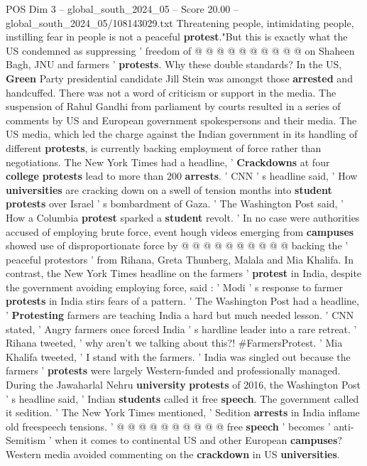 \begin{textsample}{POS Dim 3 – global\_south\_2024\_05 – Score 20.00 – global\_south\_2024\_05/108143029.txt}
Threatening people, intimidating people, instilling fear in people is not a peaceful \textbf{protest}."But this is exactly what the US condemned as suppressing ' freedom of @ @ @ @ @ @ @ @ @ @ on Shaheen Bagh, JNU and farmers ' \textbf{protests}.
Why these double standards?
In the US, \textbf{Green} Party presidential candidate Jill Stein was amongst those \textbf{arrested} and handcuffed.
There was not a word of criticism or support in the media.
The suspension of Rahul Gandhi from parliament by courts resulted in a series of comments by US and European government spokespersons and their media.
The US media, which led the charge against the Indian government in its handling of different \textbf{protests}, is currently backing employment of force rather than negotiations.
The New York Times had a headline, ' \textbf{Crackdowns} at four \textbf{college} \textbf{protests} lead to more than 200 \textbf{arrests}. ' CNN ' s headline said, ' How \textbf{universities} are cracking down on a swell of tension months into \textbf{student} \textbf{protests} over Israel ' s bombardment of Gaza. ' The Washington Post said, ' How a Columbia \textbf{protest} sparked a \textbf{student} revolt. ' In no case were authorities accused of employing brute force, event hough videos emerging from \textbf{campuses} showed use of disproportionate force by @ @ @ @ @ @ @ @ @ @ backing the ' peaceful protestors ' from Rihana, Greta Thunberg, Malala and Mia Khalifa.
In contrast, the New York Times headline on the farmers ' \textbf{protest} in India, despite the government avoiding employing force, said : ' Modi ' s response to farmer \textbf{protests} in India stirs fears of a pattern. ' The Washington Post had a headline, ' \textbf{Protesting} farmers are teaching India a hard but much needed lesson. ' CNN stated, ' Angry farmers once forced India ' s hardline leader into a rare retreat. ' Rihana tweeted, ' why aren't we talking about this?! \#FarmersProtest. ' Mia Khalifa tweeted, ' I stand with the farmers. ' India was singled out because the farmers ' \textbf{protests} were largely Western-funded and professionally managed.
During the Jawaharlal Nehru \textbf{university} \textbf{protests} of 2016, the Washington Post ' s headline said, ' Indian \textbf{students} called it free \textbf{speech}.
The government called it sedition. ' The New York Times mentioned, ' Sedition \textbf{arrests} in India inflame old freespeech tensions. ' @ @ @ @ @ @ @ @ @ @ free \textbf{speech} ' becomes ' anti-Semitism ' when it comes to continental US and other European \textbf{campuses}?
Western media avoided commenting on the \textbf{crackdown} in US \textbf{universities}.

\end{textsample}
